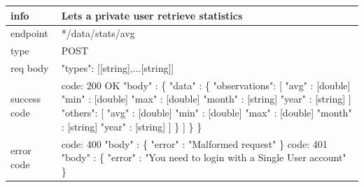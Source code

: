 \documentclass[titlepage]{article}
\begin{document}
	\vspace{\baselineskip}
	
	\begin{tabularx}{\textwidth}{lX} \hline
		info & Lets a private user retrieve statistics \\ \hline
		endpoint & */data/stats/avg \\ \hline
		type & POST \\ \hline
		req body & 
		"types": [[string],...[string]] \\ \hline
		success code & 
		code: 200 OK \newline  
		"body" : \{ \newline
		"data" :
		\{ \newline
		[ \{\newline
		"type": [string] \newline
		"observations": [ \newline
		"avg" : [double] \newline
		"min" : [double] \newline
		"max" : [double] \newline
		"month" : [string] \newline
		"year" : [string] \newline
		] \newline
		"others": [ \newline
		"avg" : [double] \newline
		"min" : [double] \newline
		"max" : [double] \newline
		"month" : [string] \newline
		"year" : [string] \newline
		] \newline \}
		] \newline
		\} \newline
		\} \\ \hline
		error code &
		code: 400 \newline
		"body" : \{ "error" : "Malformed request" \} \newline \newline
		code: 401 \newline
		"body" : \{ "error" : "You need to login with a Single User account" \} \\ \hline
	\end{tabularx}
	
	\vspace{\baselineskip}
	
\end{document}
